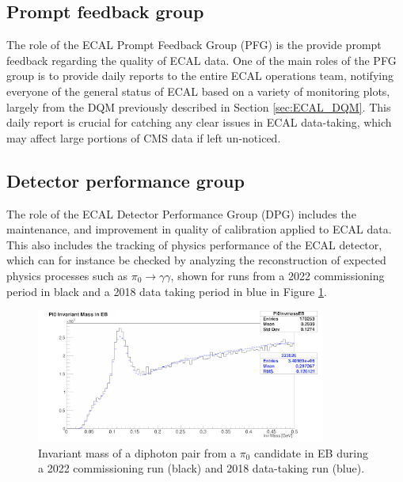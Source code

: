 \subsection{Prompt feedback group}

The role of the ECAL Prompt Feedback Group (PFG) is the provide prompt feedback regarding the quality of ECAL data. One of the main roles of the PFG group is to provide daily reports to the entire ECAL operations team, notifying everyone of the general status of ECAL based on a variety of monitoring plots, largely from the DQM previously described in Section \ref{sec:ECAL_DQM}. This daily report is crucial for catching any clear issues in ECAL data-taking, which may affect large portions of CMS data if left un-noticed. 

\subsection{Detector performance group}

The role of the ECAL Detector Performance Group (DPG) includes the maintenance, and improvement in quality of calibration applied to ECAL data. This also includes the tracking of physics performance of the ECAL detector, which can for instance be checked by analyzing the reconstruction of expected physics processes such as $\pi_{0}\rightarrow\gamma\gamma$, shown for runs from a 2022 commissioning period in black and a 2018 data taking period in blue in Figure \ref{fig:piZero_peak_13p6UnstableCollisions}.

\begin{figure}[H]
    \centering
    \includegraphics[width=0.85\textwidth]{Images/ECAL_Operations/pi0peak.png}
    \caption{Invariant mass of a diphoton pair from a $\pi_{0}$ candidate in EB during a 2022 commissioning run (black) and 2018 data-taking run (blue).}
    \label{fig:piZero_peak_13p6UnstableCollisions}
\end{figure}
